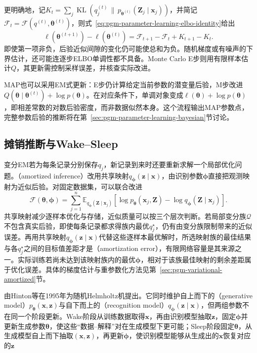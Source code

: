 更明确地，记$K_t=\sum_j\operatorname{KL}(q_j^{(t)}\,\|\,p_{\bm{\theta}^{(t)}}(\bm{Z}_j\mid\bm{x}_j))$，并简记$\mathcal{F}_t=\mathcal{F}(q^{(t)},\bm{\theta}^{(t)})$，则式~\eqref{eq:pgm-parameter-learning-elbo-identity}给出
\[
  \ell(\bm{\theta}^{(t+1)})-\ell(\bm{\theta}^{(t)})
  =\mathcal{F}_{t+1}-\mathcal{F}_t+K_{t+1}-K_t.
\]
即使第一项非负，后验近似间隙的变化仍可能使总和为负。随机梯度或有噪声的下界估计，还可能连逐步ELBO单调性都不具备。Monte Carlo E步则用有限样本估计$Q$，其更新需控制采样误差，并核查实际改进。

MAP也可以采用EM式更新：E步仍计算给定当前参数的潜变量后验，M步改进$Q(\bm{\theta}\mid\bm{\theta}^{(t)})+\log p(\bm{\theta})$。在对应条件下，单调对象变成$\ell(\bm{\theta})+\log p(\bm{\theta})$，即相差常数的对数后验密度，而非数据似然本身。这个流程输出MAP参数点，完整参数后验的推断将在第~\ref{sec:pgm-parameter-learning-bayesian}节讨论。

\subsection{摊销推断与Wake--Sleep}
\label{sec:pgm-parameter-learning-amortized}

变分EM若为每条记录分别保存$q_j$，新记录到来时还要重新求解一个局部优化问题。（amortized inference）改用共享映射$q_{\bm{\phi}}(\bm{z}\mid\bm{x})$，由识别参数$\bm{\phi}$直接把观测映射为近似后验。对固定数据集，可以联合改进
\[
  \mathcal{F}(\bm{\theta},\bm{\phi})
  =\sum_{j=1}^n\mathbb{E}_{q_{\bm{\phi}}(\bm{Z}\mid\bm{x}_j)}
    [\log p_{\bm{\theta}}(\bm{x}_j,\bm{Z})
     -\log q_{\bm{\phi}}(\bm{Z}\mid\bm{x}_j)].
\]
共享映射减少逐样本优化与存储，近似质量可以按三个层次判断。若局部变分族$\mathcal{Q}$不包含真实后验，即使每条记录都求得族内最优$q_j^\star$，仍有由变分族限制带来的近似误差。再用共享映射$q_{\bm{\phi}}(\bm{z}\mid\bm{x})$代替这些逐样本最优解时，所选映射族的最佳结果与各$q_j^\star$之间的目标值差距才是（amortization error），有限网络容量是其来源之一。实际训练若尚未达到该映射族内的最优$\bm{\phi}$，相对于该族最佳映射的剩余差距属于优化误差。具体的梯度估计与重参数化方法见第~\ref{sec:pgm-variational-amortized}节。

由Hinton等在1995年为随机Helmholtz机提出。它同时维护自上而下的（generative model）$p_{\bm{\theta}}(\bm{x},\bm{z})$与自下而上的（recognition model）$q_{\bm{\phi}}(\bm{z}\mid\bm{x})$，但两组参数不在同一个阶段更新。Wake阶段从训练数据取得$\bm{x}$，再由识别模型抽取$\bm{z}$，固定$\bm{\phi}$并更新生成参数$\bm{\theta}$，使这些“数据--解释”对在生成模型下更可能；Sleep阶段固定$\bm{\theta}$，从生成模型自上而下抽取$(\bm{x},\bm{z})$，再更新$\bm{\phi}$，使识别模型能够从生成出的$\bm{x}$恢复对应的$\bm{z}$

